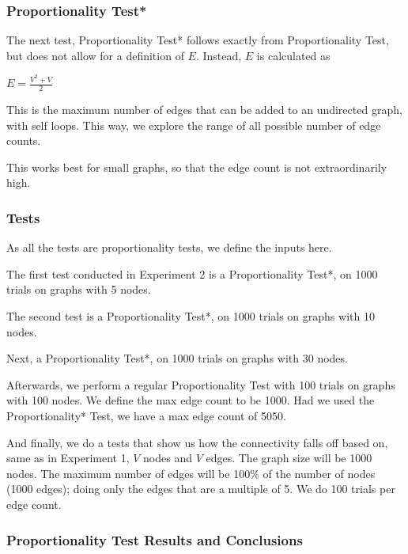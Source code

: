\documentclass[12pt]{article}
\begin{document}
\subsubsection*{Proportionality Test*}
The next test, Proportionality Test* follows exactly from Proportionality Test, but does not allow for a definition of $E$. Instead, $E$ is calculated as

\begin{center}
    $E = \frac{V^2 + V}{2}$
\end{center}

This is the maximum number of edges that can be added to an undirected graph, with self loops. This way, we explore the range of all possible number of edge counts.

This works best for small graphs, so that the edge count is not extraordinarily high.


\subsubsection{Tests}

As all the tests are proportionality tests, we define the inputs here.

The first test conducted in Experiment 2 is a Proportionality Test*, on 1000 trials on graphs with 5 nodes.

The second test is a Proportionality Test*, on 1000 trials on graphs with 10 nodes.

Next, a Proportionality Test*, on 1000 trials on graphs with 30 nodes.

Afterwards, we perform a regular Proportionality Test with 100 trials on graphs with 100 nodes. We define the max edge count to be 1000. Had we used the Proportionality* Test, we have a max edge count of 5050.

And finally, we do a tests that show us how the connectivity falls off based on, same as in Experiment 1, $V$ nodes and $V$ edges. 
The graph size will be 1000 nodes. The maximum number of edges will be 100\% of the number of nodes (1000 edges); doing only the edges that are a multiple of 5. We do 100 trials per edge count.


\subsubsection{Proportionality Test Results and Conclusions}

%
%
%
%
\newpage
\end{document}
